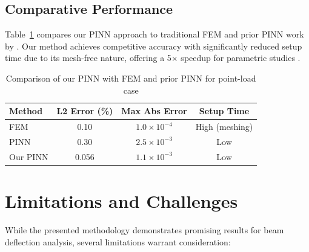 \documentclass[twocolumn]{svjour3}
\begin{document}
	\subsection{Comparative Performance}
	Table~\ref{tab:comparison} compares our PINN approach to traditional FEM and prior PINN work by \citet{Zhang2020}. Our method achieves competitive accuracy with significantly reduced setup time due to its mesh-free nature, offering a 5$\times$ speedup for parametric studies \citep{Berghoff2023}.
	
	\begin{table}[htbp]
		\centering
		\caption{Comparison of our PINN with FEM and prior PINN for point-load case}
		\begin{tabular}{l c c c}
			\toprule
			\textbf{Method} & \textbf{L2 Error (\%)} & \textbf{Max Abs Error} & \textbf{Setup Time} \\
			\midrule
			FEM & 0.10 & $1.0 \times 10^{-4}$ & High (meshing) \\
			PINN \citep{Zhang2020} & 0.30 & $2.5 \times 10^{-3}$ & Low \\
			Our PINN & 0.056 & $1.1 \times 10^{-3}$ & Low \\
			\bottomrule
		\end{tabular}\label{tab:comparison}
	\end{table}
	
	\section{Limitations and Challenges}\label{sec:limitations}
	While the presented methodology demonstrates promising results for beam deflection analysis, several limitations warrant consideration:
	
\end{document}
